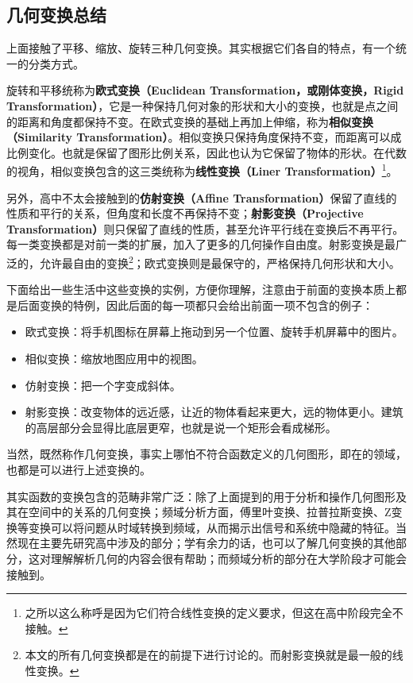 \subsection{几何变换总结}

上面接触了平移、缩放、旋转三种几何变换。其实根据它们各自的特点，有一个统一的分类方式。

旋转和平移统称为\textbf{欧式变换（Euclidean Transformation，或刚体变换，Rigid Transformation）}，它是一种保持几何对象的形状和大小的变换，也就是点之间的距离和角度都保持不变。在欧式变换的基础上再加上伸缩，称为\textbf{相似变换（Similarity Transformation）}。相似变换只保持角度保持不变，而距离可以成比例变化。也就是保留了图形比例关系，因此也认为它保留了物体的形状。在代数的视角，相似变换包含的这三类统称为\textbf{线性变换（Liner Transformation）}\footnote{之所以这么称呼是因为它们符合线性变换的定义要求，但这在高中阶段完全不接触。}。

另外，高中不太会接触到的\textbf{仿射变换（Affine Transformation）}保留了直线的性质和平行的关系，但角度和长度不再保持不变；\textbf{射影变换（Projective Transformation）}则只保留了直线的性质，甚至允许平行线在变换后不再平行。每一类变换都是对前一类的扩展，加入了更多的几何操作自由度。射影变换是最广泛的，允许最自由的变换\footnote{本文的所有几何变换都是在的前提下进行讨论的。而射影变换就是最一般的线性变换。}；欧式变换则是最保守的，严格保持几何形状和大小。

下面给出一些生活中这些变换的实例，方便你理解，注意由于前面的变换本质上都是后面变换的特例，因此后面的每一项都只会给出前面一项不包含的例子：

\begin{itemize}
\item 欧式变换：将手机图标在屏幕上拖动到另一个位置、旋转手机屏幕中的图片。
\item 相似变换：缩放地图应用中的视图。
\item 仿射变换：把一个字变成斜体。
\item 射影变换：改变物体的远近感，让近的物体看起来更大，远的物体更小。建筑的高层部分会显得比底层更窄，也就是说一个矩形会看成梯形。
\end{itemize}

当然，既然称作几何变换，事实上哪怕不符合函数定义的几何图形，即在的领域，也都是可以进行上述变换的。

其实函数的变换包含的范畴非常广泛：除了上面提到的用于分析和操作几何图形及其在空间中的关系的几何变换；频域分析方面，傅里叶变换、拉普拉斯变换、Z变换等变换可以将问题从时域转换到频域，从而揭示出信号和系统中隐藏的特征。当然现在主要先研究高中涉及的部分；学有余力的话，也可以了解几何变换的其他部分，这对理解解析几何的内容会很有帮助；而频域分析的部分在大学阶段才可能会接触到。
